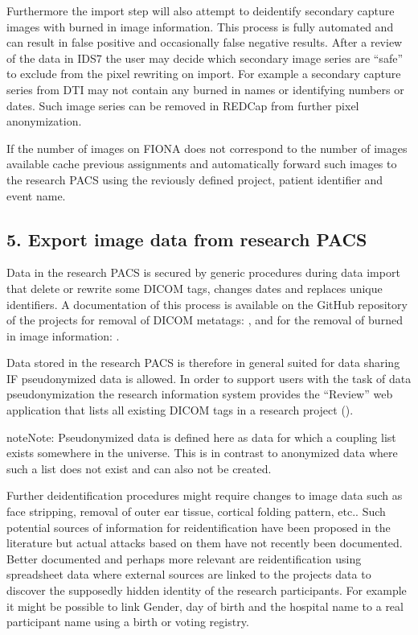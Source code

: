 \documentclass[letterpaper,10pt,english]{sphinxmanual}
\begin{document}
\sphinxAtStartPar
Furthermore the import step will also attempt to de\sphinxhyphen{}identify secondary capture images with burned in image information. This process is fully automated and can result in false positive and occasionally false negative results. After a review of the data in IDS7 the user may decide which secondary image series are “safe” to exclude from the pixel rewriting on import. For example a secondary capture series from DTI may not contain any burned in names or identifying numbers or dates. Such image series can be removed in REDCap from further pixel anonymization.

\sphinxAtStartPar
If the number of images on FIONA does not correspond to the number of images available cache previous assignments and automatically forward such images to the research PACS using the reviously defined project, patient identifier and event name.


\subsection{5. Export image data from research PACS}
\label{\detokenize{EndUser/end-user:export-image-data-from-research-pacs}}
\sphinxAtStartPar
Data in the research PACS is secured by generic procedures during data import that delete or rewrite some DICOM tags, changes dates and replaces unique identifiers. A documentation of this process is available on the GitHub repository of the projects for removal of DICOM meta\sphinxhyphen{}tags:
, and for the removal of burned in image information: .

\sphinxAtStartPar
Data stored in the research PACS is therefore in general suited for data sharing IF pseudonymized data is allowed. In order to support users with the task of data pseudonymization the research information system provides the “Review” web application that lists all existing DICOM tags in a research project ().

\begin{sphinxadmonition}{note}{Note:}
\sphinxAtStartPar
Pseudonymized data is defined here as data for which a coupling list exists somewhere in the universe. This is in contrast to anonymized data where such a list does not exist and can also not be created.
\end{sphinxadmonition}

\sphinxAtStartPar
Further de\sphinxhyphen{}identification procedures might require changes to image data such as face stripping, removal of outer ear tissue, cortical folding pattern, etc.. Such potential sources of information for re\sphinxhyphen{}identification have been proposed in the literature but actual attacks based on them have not recently been documented. Better documented and perhaps more relevant are re\sphinxhyphen{}identification using spreadsheet data where external sources are linked to the projects data to discover the supposedly hidden identity of the research participants. For example it might be possible to link Gender, day of birth and the hospital name to a real participant name using a birth or voting registry.
\end{document}
